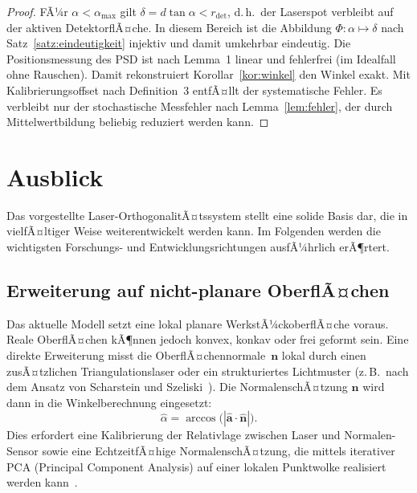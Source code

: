 ﻿\documentclass[a4paper,12pt]{article}
\theoremstyle{definition}
\begin{document}
\begin{proof}
  FÃ¼r $\alpha < \alpha_{\max}$ gilt $\delta = d\tan\alpha < r_{\mathrm{det}}$,
  d.\,h.\ der Laserspot verbleibt auf der aktiven DetektorflÃ¤che.
  In diesem Bereich ist die Abbildung $\Phi: \alpha \mapsto \delta$ nach
  Satz~\ref{satz:eindeutigkeit} injektiv und damit umkehrbar eindeutig.
  Die Positionsmessung des PSD ist nach Lemma~1 linear und fehlerfrei
  (im Idealfall ohne Rauschen).
  Damit rekonstruiert Korollar~\ref{kor:winkel} den Winkel exakt.
  Mit Kalibrierungsoffset nach Definition~3 entfÃ¤llt der systematische Fehler.
  Es verbleibt nur der stochastische Messfehler nach Lemma~\ref{lem:fehler},
  der durch Mittelwertbildung beliebig reduziert werden kann. \qedhere
\end{proof}

\section{Ausblick}

Das vorgestellte Laser-OrthogonalitÃ¤tssystem stellt eine solide Basis dar,
die in vielfÃ¤ltiger Weise weiterentwickelt werden kann. Im Folgenden werden
die wichtigsten Forschungs- und Entwicklungsrichtungen ausfÃ¼hrlich erÃ¶rtert.

\subsection{Erweiterung auf nicht-planare OberflÃ¤chen}

Das aktuelle Modell setzt eine lokal planare WerkstÃ¼ckoberflÃ¤che voraus.
Reale OberflÃ¤chen kÃ¶nnen jedoch konvex, konkav oder frei geformt sein.
Eine direkte Erweiterung misst die OberflÃ¤chennormale~$\mathbf{n}$ lokal
durch einen zusÃ¤tzlichen Triangulationslaser oder ein strukturiertes Lichtmuster
(z.\,B.\ nach dem Ansatz von Scharstein und Szeliski~\cite{scharstein2002taxonomy}).
Die NormalenschÃ¤tzung $\hat{\mathbf{n}}$ wird dann in die Winkelberechnung
eingesetzt:
\[
  \hat{\alpha} = \arccos\!\bigl(|\hat{\mathbf{a}} \cdot \hat{\mathbf{n}}|\bigr).
\]
Dies erfordert eine Kalibrierung der Relativlage zwischen Laser und
Normalen-Sensor sowie eine EchtzeitfÃ¤hige NormalenschÃ¤tzung, die mittels
iterativer PCA (Principal Component Analysis) auf einer lokalen Punktwolke
realisiert werden kann~\cite{rusu2011fast}.
\end{document}
